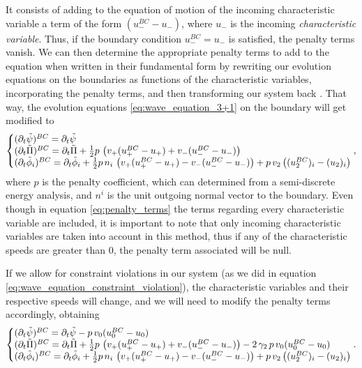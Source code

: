 It consists of adding to the equation of motion of the incoming characteristic variable a term of the form $(u_-^{BC}  - u_-)$, where $u_-$ is the incoming \textit{characteristic variable}. Thus, if the boundary condition $u_-^{BC} = u_-$ is satisfied, the penalty terms vanish. We can then determine the appropriate penalty terms to add to the equation when written in their fundamental form by rewriting our evolution equations on the boundaries as functions of the characteristic variables, incorporating the penalty terms, and then transforming our system back \cite{Pseudospectral_method_for_gravitational_wave_collapse,Spectral_methods_for_the_wave_equation_in_second-order_form}. That way, the evolution equations \eqref{eq:wave_equation_3+1} on the boundary will get modified to
%
\begin{align}
    \left\{\begin{array}{@{}l@{}} 
        (\partial_t\tilde{\psi})^{BC} = \partial_t\tilde{\psi} \\
        (\partial_t\tilde{\Pi})^{BC} = \partial_t\tilde{\Pi} + \frac{1}{2} p \, \left( v_+(u_+^{BC}  - u_+) + v_- (u_-^{BC}  - u_-) \right) \\
        (\partial_t\tilde{\phi}_i)^{BC} = \partial_t\tilde{\phi}_i + \frac{1}{2} p \, n_i \, \left( v_+(u_+^{BC}  - u_+) - v_- (u_-^{BC}  - u_-) \right)  + p \, v_2 \left((u_2^{BC})_i  - (u_2)_i \right) \\
    \end{array}\right. ,
    \label{eq:penalty_terms}
\end{align}
%
where $p$ is the penalty coefficient, which can determined from a semi-discrete energy analysis, and $n^i$ is the unit outgoing normal vector to the boundary. Even though in equation \eqref{eq:penalty_terms} the terms regarding every characteristic variable are included, it is important to note that only incoming characteristic variables are taken into account in this method, thus if any of the characteristic speeds are greater than $0$, the penalty term associated will be null. 

If we allow for constraint violations in our system (as we did in equation \eqref{eq:wave_equation_constraint_violation}), the characteristic variables and their respective speeds will change, and we will need to modify the penalty terms accordingly, obtaining
%
\begin{align}
    \left\{\begin{array}{@{}l@{}} 
        (\partial_t\tilde{\psi})^{BC} = \partial_t\tilde{\psi} - p \, v_0 (u_0^{BC}  - u_0)\\
        (\partial_t\tilde{\Pi})^{BC} = \partial_t\tilde{\Pi} + \frac{1}{2} p \, \left( v_+(u_+^{BC}  - u_+) + v_- (u_-^{BC}  - u_-) \right) - 2 \, \gamma_2 \, p \, v_0 (u_0^{BC}  - u_0)\\
        (\partial_t\tilde{\phi}_i)^{BC} = \partial_t\tilde{\phi}_i + \frac{1}{2} p \, n_i \, \left( v_+(u_+^{BC}  - u_+) - v_- (u_-^{BC}  - u_-) \right)  + p \, v_2 \left((u_2^{BC})_i  - (u_2)_i \right) \\
    \end{array}\right. .
\end{align}

